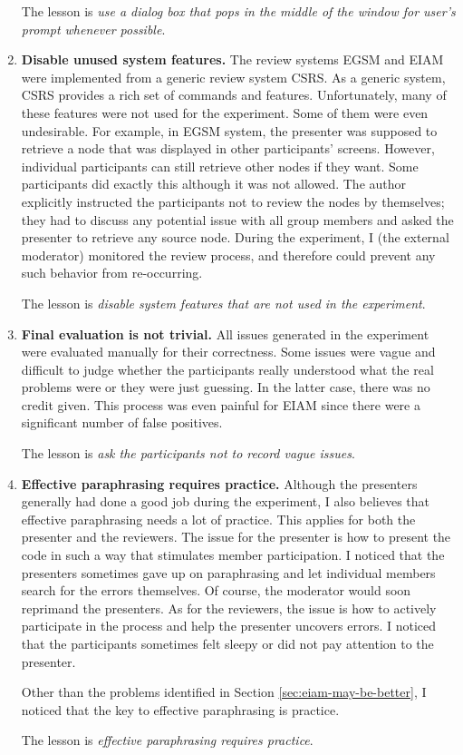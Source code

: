 \begin{enumerate}
The lesson is {\it use a dialog box that pops in the middle of
the window  for user's prompt whenever possible}.

\item {\bf Disable unused system features.}
The review systems EGSM and EIAM were implemented from a generic
review system CSRS. As a generic system, CSRS provides a rich set of
commands and features.
Unfortunately, many of these features were not used for the
experiment. Some of them were even undesirable. For example, in
EGSM system, the presenter was supposed to retrieve a node that was
displayed in other participants' screens. However, individual
participants can still retrieve other nodes if they want.
Some participants did exactly this although it was not allowed. The
author explicitly instructed the participants not to review the nodes
by themselves; they had to discuss any potential issue with all group
members and asked the presenter to retrieve any source node.
During the experiment, I (the external moderator) monitored the review
process, and therefore could prevent any such behavior from re-occurring.

The lesson is {\it disable system features that are
not used in the experiment}.

\item {\bf Final evaluation is not trivial.}
All issues generated in the experiment were evaluated manually for their
correctness. 
Some issues were vague and difficult to judge whether the participants
really understood what the real problems were or they were just
guessing. In the latter case, there was no credit given.
This process was even painful for EIAM since there were
a significant number of false positives.

The lesson is {\it ask the participants not to record vague issues}.

\item {\bf Effective paraphrasing requires practice.}
Although the presenters generally had done a good job during the
experiment, I also believes that effective paraphrasing needs
a lot of practice. This applies for both the presenter and the
reviewers. The issue for the presenter is how to present the code
in such a way that stimulates member participation.
I noticed that the presenters sometimes gave up on
paraphrasing and let individual members search for the errors
themselves. Of course, the moderator would soon reprimand the
presenters. 
As for the reviewers, the issue is how to actively participate in the
process and help the presenter uncovers errors.
I noticed that the participants sometimes felt sleepy or did not
pay attention to the presenter.

Other than the problems identified in Section
\ref{sec:eiam-may-be-better},  I noticed that the key to
effective paraphrasing is practice. 

The lesson is {\it effective paraphrasing requires practice}.
\end{enumerate}


